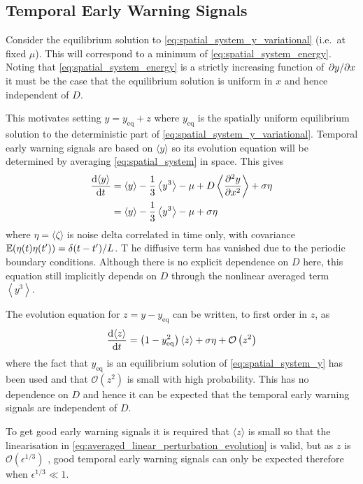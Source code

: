 \subsection{Temporal Early Warning Signals}
Consider the equilibrium solution to \cref{eq:spatial_system_y_variational} (i.e.\ at fixed $\mu$). This will correspond to a minimum
of \cref{eq:spatial_system_energy}. Noting that \cref{eq:spatial_system_energy} is a strictly increasing function of $\pdv*{y}{x}$ it must be the case
that the equilibrium solution is uniform in $x$ and hence independent of $D$.

This motivates setting $y = y_{\mathrm{eq}} + z$ where $y_{\mathrm{eq}}$ is the spatially uniform equilibrium solution to 
the deterministic part of \cref{eq:spatial_system_y_variational}. Temporal
early warning signals are based on $\langle y \rangle$ so its evolution equation will be determined by averaging \cref{eq:spatial_system} in space.
This gives
\begin{align*}
  \dv{\langle y \rangle}{t} &= \langle y \rangle - \frac{1}{3} \left\langle y^3 \right\rangle - \mu + D \left\langle \pdv[2]{y}{x} \right\rangle + \sigma \eta \\
                            &= \langle y \rangle - \frac{1}{3} \left\langle y^3 \right\rangle - \mu + \sigma \eta
\end{align*}
where $\eta = \langle \zeta \rangle$ is noise delta correlated in time only, with covariance $\operatorname*{\mathbb{E}}(\eta(t)\eta(t')) = \delta(t-t')/L$. T
he diffusive term has vanished due to the periodic boundary conditions. Although there is no explicit dependence on $D$ here,
this equation still implicitly depends on $D$ through the nonlinear averaged term $\left\langle y^3 \right\rangle$.

The evolution equation for $z = y - y_{\mathrm{eq}}$  can be written, to first order in $z$, as
\begin{equation}
  \label{eq:averaged_linear_perturbation_evolution}
  \dv{\langle z\rangle}{t} = \left(1 - y_{\mathrm{eq}}^2\right)\left\langle z \right \rangle + \sigma \eta  + \mathcal{O}\left(z^2 \right)
\end{equation}
where the fact that $y_{\mathrm{eq}}$ is an equilibrium solution of \cref{eq:spatial_system_y} has been used and that $\mathcal{O}(z^2)$ is small with high probability.
This has no dependence on
$D$ and hence it can be expected that the temporal early warning signals are independent of $D$.

To get good early warning signals it is required that $\langle z\rangle$ is small so that the linearisation in
\cref{eq:averaged_linear_perturbation_evolution} is valid, but as $z$ is $\mathcal{O}\left(\epsilon^{1/3}\right)$ \parencite{Berglund2006},
good temporal early warning signals can only be expected therefore when $\epsilon^{1/3} \ll 1$.

